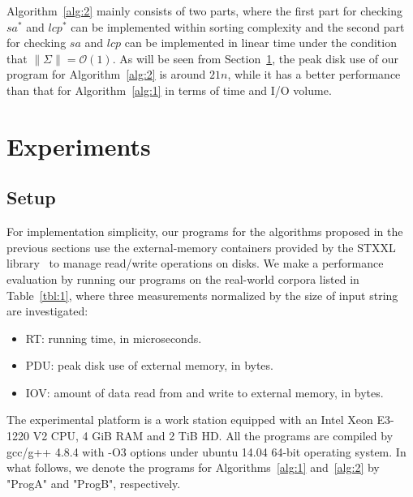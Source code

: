 \documentclass[10pt,journal,compsoc]{IEEEtran}
\begin{document}
Algorithm~\ref{alg:2} mainly consists of two parts, where the first part for checking $sa^*$ and $lcp^*$ can be implemented within sorting complexity and the second part for checking $sa$ and $lcp$ can be implemented in linear time under the condition that $\|\Sigma\| = \mathcal{O}(1)$. As will be seen from Section~\ref{sec:experiment}, the peak disk use of our program for Algorithm~\ref{alg:2} is around $21n$, while it has a better performance than that for Algorithm~\ref{alg:1} in terms of time and I/O volume.

\section{Experiments} \label{sec:experiment}

\subsection{Setup} \label{sec:experiment:setup}

For implementation simplicity, our programs for the algorithms proposed in the previous sections use the external-memory containers provided by the STXXL library~\cite{Dementiev2007} to manage read/write operations on disks. We make a performance evaluation by running our programs on the real-world corpora listed in Table~\ref{tbl:1}, where three measurements normalized by the size of input string are investigated:

\begin{itemize}
	
	\item RT: running time, in microseconds.
	
	\item PDU: peak disk use of external memory, in bytes.
	
	\item IOV: amount of data read from and write to external memory, in bytes.
	
\end{itemize}

The experimental platform is a work station equipped with an Intel Xeon E3-1220 V2 CPU, 4 GiB RAM and 2 TiB HD. All the programs are compiled by gcc/g++ 4.8.4 with -O3 options under ubuntu 14.04 64-bit operating system. In what follows, we denote the programs for Algorithms~\ref{alg:1} and~\ref{alg:2} by "ProgA" and "ProgB", respectively. 
	
\end{document}
